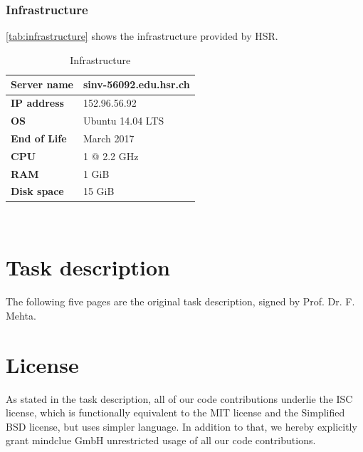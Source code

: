 \documentclass[a4paper]{report}
\begin{document}
\subsection{Infrastructure}
\autoref{tab:infrastructure} shows the infrastructure provided by HSR.
\begin{table}[H]
  \centering
  \scriptsize
  \begin{tabular}{|p{25mm}|p{30mm}|}
    \hline 	\bf Server name & sinv-56092.edu.hsr.ch \\ \hline
	\bf IP address & 152.96.56.92 \\ \hline
	\bf OS & Ubuntu 14.04 LTS \\ \hline
	  \bf End of Life & March \nth{3} 2017 \\ \hline
	\bf CPU & 1 @ 2.2 GHz \\ \hline
	\bf RAM & 1 GiB \\ \hline
	\bf Disk space & 15 GiB \\ \hline
  \end{tabular} \\
  \caption{Infrastructure}
  \label{tab:infrastructure}
\end{table}

\chapter{Task description}\label{ch:task-desc}
The following five pages are the original task description, signed by Prof. Dr. F. Mehta.


\chapter{License}
As stated in the task description, all of our code contributions underlie the
ISC license, which is functionally equivalent to the MIT license and the
Simplified BSD license, but uses simpler language. In addition to that, we
hereby explicitly grant mindclue GmbH unrestricted usage of all our code
contributions.







\end{document}
